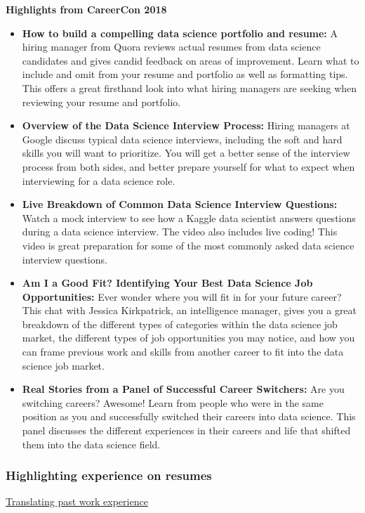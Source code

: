 \documentclass[]{article}
\begin{document}
\textbf{Highlights from CareerCon 2018}
\begin{itemize}
  \item \textbf{How to build a compelling data science portfolio and resume:} A hiring manager from Quora reviews actual resumes from data science candidates and gives candid feedback on areas of improvement. Learn what to include and omit from your resume and  portfolio as well as formatting tips. This offers a great firsthand look into what hiring managers are seeking when reviewing your resume and portfolio.
  \item \textbf{Overview of the Data Science Interview Process:} Hiring managers at Google discuss typical data science interviews, including the soft and hard skills you will want to prioritize. You will get a better sense of the interview process from both sides, and better prepare yourself for what to expect when interviewing for a data science role.
  \item \textbf{Live Breakdown of Common Data Science Interview Questions:} Watch a mock interview to see how a Kaggle data scientist answers questions during a data science interview. The video also includes live coding! This video is great preparation for some of the most commonly asked data science interview questions.
  \item \textbf{Am I a Good Fit? Identifying Your Best Data Science Job Opportunities:} Ever wonder where you will fit in for your future career? This chat with Jessica Kirkpatrick, an intelligence manager, gives you a great breakdown of the different types of categories within the data science job market, the different types of job opportunities you may notice, and how you can frame previous work and skills from another career to fit into the data science job market.
  \item \textbf{Real Stories from a Panel of Successful Career Switchers:} Are you switching careers? Awesome! Learn from people who were in the same position as you and successfully switched their careers into data science. This panel discusses the different experiences in their careers and life that shifted them into the data science field.
\end{itemize}

\subsubsection{Highlighting experience on resumes}

\uline{Translating past work experience}
\end{document}
